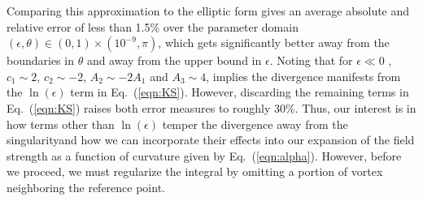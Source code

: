 \documentclass[aps,graphicx,reprint,onecolumn,12pt,tightenlines,longbibliography]{revtex4-1}
\newcommand{\sas}[2]{{#2}}
\begin{document}
%
Comparing this approximation to the elliptic form gives an average absolute and relative error of less than 1.5\% over the parameter domain $(\epsilon, \theta) \in (0,1) \times (10^{-9},\pi)$, which gets significantly better away from the boundaries in $\theta$ and away from the upper bound in $\epsilon$. Noting that \sas{as $\epsilon{\to} 0$}{for $\epsilon{\ll} 0$} , $c_{1} \sim 2$, $c_{2} \sim -2$, $A_{2}\sim -2A_{1}$ and $A_{3} \sim 4$, implies the divergence manifests from the $\ln(\epsilon)$ term in Eq.~(\ref{eqn:KS}). However, discarding the remaining terms in Eq.~(\ref{eqn:KS}) raises both error measures to roughly 30\%. Thus, our interest is in how terms other than $\ln(\epsilon)$ temper the divergence away from the singularity\sas{.}{and how we can incorporate their effects into our expansion of the field strength as a function of curvature given by Eq.~(\ref{eqn:alpha}). }However, before we proceed, we must regularize the integral by omitting a portion of vortex neighboring the reference point.     
%
%
\end{document}
